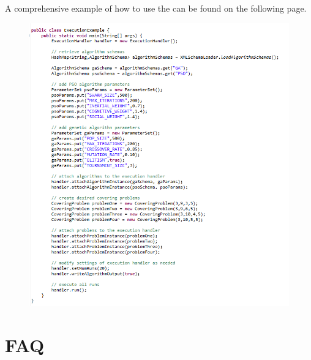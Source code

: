 \documentclass[titlepage]{article}
\begin{document}
A comprehensive example of how to use the  can be found on the following page.


\begin{figure}[H]
\centering
\includegraphics[width=190mm]{Images/ExecutionHandlerExample.png}
\end{figure}

\section{FAQ}
\end{document}
